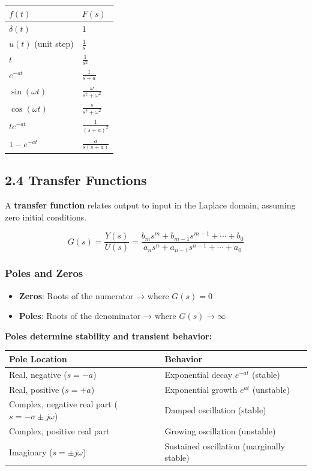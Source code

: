 \documentclass[11pt,a4paper]{book}
\begin{document}
\begin{center}
\begin{tabular}{|l|l|}
\hline
$f(t)$ & $F(s)$ \\
\hline
$\delta(t)$ & $1$ \\
$u(t)$ (unit step) & $\frac{1}{s}$ \\
$t$ & $\frac{1}{s^2}$ \\
$e^{-at}$ & $\frac{1}{s+a}$ \\
$\sin(\omega t)$ & $\frac{\omega}{s^2+\omega^2}$ \\
$\cos(\omega t)$ & $\frac{s}{s^2+\omega^2}$ \\
$t e^{-at}$ & $\frac{1}{(s+a)^2}$ \\
$1 - e^{-at}$ & $\frac{a}{s(s+a)}$ \\
\hline
\end{tabular}
\end{center}

\medskip\noindent\hrulefill\medskip

\subsection{2.4 Transfer Functions}

A \textbf{transfer function} relates output to input in the Laplace domain, assuming zero initial conditions.

\[G(s) = \frac{Y(s)}{U(s)} = \frac{b_m s^m + b_{m-1} s^{m-1} + \cdots + b_0}{a_n s^n + a_{n-1} s^{n-1} + \cdots + a_0}\]

\subsubsection{Poles and Zeros}

\begin{itemize}
\item \textbf{Zeros}: Roots of the numerator → where $G(s) = 0$
\item \textbf{Poles}: Roots of the denominator → where $G(s) \to \infty$
\end{itemize}

\textbf{Poles determine stability and transient behavior:}

\begin{center}
\begin{tabular}{|l|l|}
\hline
Pole Location & Behavior \\
\hline
Real, negative ($s = -a$) & Exponential decay $e^{-at}$ (stable) \\
Real, positive ($s = +a$) & Exponential growth $e^{at}$ (unstable) \\
Complex, negative real part ($s = -\sigma \pm j\omega$) & Damped oscillation (stable) \\
Complex, positive real part & Growing oscillation (unstable) \\
Imaginary ($s = \pm j\omega$) & Sustained oscillation (marginally stable) \\
\hline
\end{tabular}
\end{center}
\end{document}
